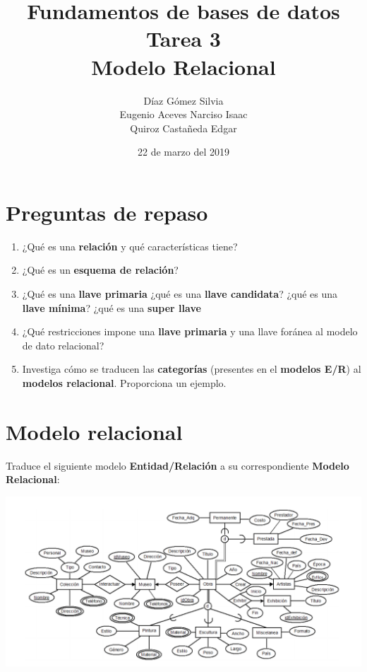 \documentclass{article}
\begin{document}
    \title{
        Fundamentos de bases de datos \\
        Tarea 3 \\
        Modelo Relacional
    }
    \author{
        Díaz Gómez Silvia \\
        Eugenio Aceves Narciso Isaac \\
        Quiroz Castañeda Edgar
    }
    \date {
        22 de marzo del 2019    
    }
    \maketitle

    \section{Preguntas de repaso}
    \begin{enumerate}[label = \alph*.]
        \item ¿Qué es una \textbf{relación} y qué características tiene?
        \item ¿Qué es un \textbf{esquema de relación}?
        \item ¿Qué es una \textbf{llave primaria} ¿qué es una \textbf{llave 
        candidata}? ¿qué es una \textbf{llave mínima}? ¿qué es una \textbf{super
        llave}
        \item ¿Qué restricciones impone una \textbf{llave primaria} y una llave 
        foránea al modelo de dato relacional?
        \item Investiga cómo se traducen las \textbf{categorías} (presentes en
        el \textbf{modelos E/R}) al \textbf{modelos relacional}. Proporciona un 
        ejemplo.
    \end{enumerate}

    \section{Modelo relacional}
    Traduce el siguiente modelo \textbf{Entidad/Relación} a su correspondiente 
    \textbf{Modelo Relacional}:
    
    \begin{center}
        \includegraphics[width=1\textwidth]{er1.png}
    \end{center}
        
\end{document}
